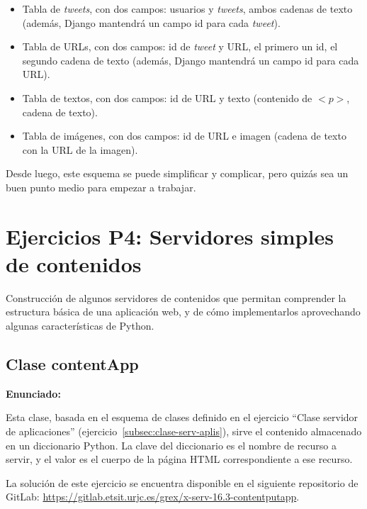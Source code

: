 \begin{itemize}
\item Tabla de \emph{tweets}, con dos campos: usuarios y \emph{tweets}, ambos cadenas de texto (además, Django mantendrá un campo id para cada \emph{tweet}).
\item Tabla de URLs, con dos campos: id de \emph{tweet} y URL, el primero un id, el segundo cadena de texto (además, Django mantendrá un campo id para cada URL).
\item Tabla de textos, con dos campos: id de URL y texto (contenido de $<p>$, cadena de texto).
\item Tabla de imágenes, con dos campos: id de URL e imagen (cadena de texto con la URL de la imagen).
\end{itemize}

Desde luego, este esquema se puede simplificar y complicar, pero quizás sea un buen punto medio para empezar a trabajar.

\section{Ejercicios P4: Servidores simples de contenidos}

Construcción de algunos servidores de contenidos que permitan comprender la estructura básica de una aplicación web, y de cómo implementarlos aprovechando algunas características de Python.

\subsection{Clase contentApp}
\label{subsec:contentapp}

\textbf{Enunciado:}

Esta clase, basada en el esquema de clases definido en el ejercicio ``Clase servidor de aplicaciones'' (ejercicio~\ref{subsec:clase-serv-aplis}), sirve el contenido almacenado en un diccionario Python. La clave del diccionario es el nombre de recurso a servir, y el valor es el cuerpo de la página HTML correspondiente a ese recurso.

La solución de este ejercicio se encuentra disponible en el siguiente repositorio de 
GitLab: \url{https://gitlab.etsit.urjc.es/grex/x-serv-16.3-contentputapp}.

